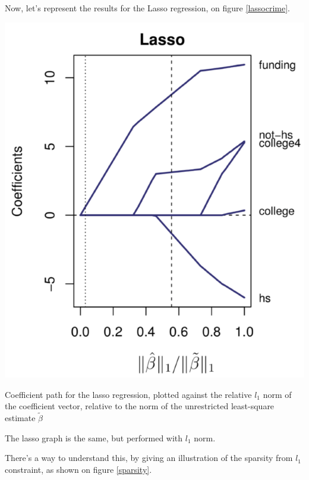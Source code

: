\documentclass[a4paper]{tufte-book}
\begin{document}
Now, let's represent the results for the Lasso regression, on figure
\ref{lassocrime}.
\begin{marginfigure}
    \includegraphics{./Figures/lassocrime.png}
    \caption{Coefficient path for the lasso regression, plotted against the
        relative $l_1$ norm of the coefficient vector, relative to the norm of
        the unrestricted least-square estimate $\tilde \beta$
    }
    \label{lassocrime}
\end{marginfigure}

The lasso graph is the same, but performed with $l_1$ norm.

There’s a way to understand this, by giving an illustration of the sparsity from
$l_1$ constraint, as shown on figure \ref{sparsity}.
\end{document}
